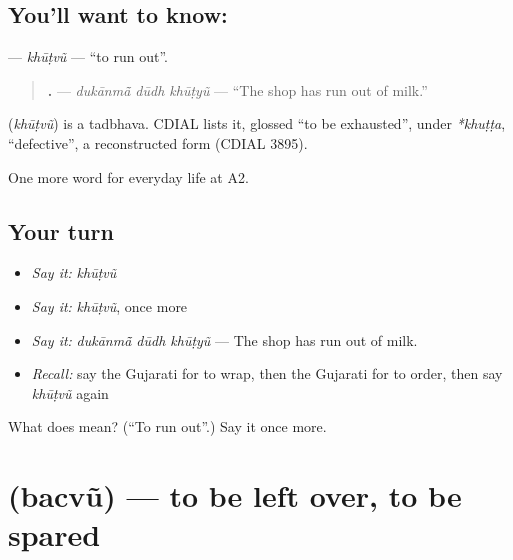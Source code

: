 \subsection*{You'll want to know: }
\textbf{} — \emph{khūṭvũ} — \textquotedblleft{}to run out\textquotedblright{}.

\begin{quote}
\textbf{  .} — \emph{dukānmā̃ dūdh khūṭyũ} — \textquotedblleft{}The shop has run out of milk.\textquotedblright{}
\end{quote}

\begin{cousinweb}
\textbf{} (\emph{khūṭvũ}) is a tadbhava. CDIAL lists it, glossed \textquotedblleft{}to be exhausted\textquotedblright{}, under \emph{*khuṭṭa}, \textquotedblleft{}defective\textquotedblright{}, a reconstructed form (CDIAL 3895).
\end{cousinweb}

\begin{grammarlens}[title={What you've built}]
One more word for everyday life at A2.
\end{grammarlens}

\subsection*{Your turn}
\begin{itemize}
\raggedright
  \item \emph{Say it:} \emph{khūṭvũ}
  \item \emph{Say it:} \emph{khūṭvũ}, once more
  \item \emph{Say it:} \emph{dukānmā̃ dūdh khūṭyũ} — The shop has run out of milk.
  \item \emph{Recall:} say the Gujarati for to wrap, then the Gujarati for to order, then say \emph{khūṭvũ} again
\end{itemize}

\begin{tcolorbox}[breakable,colback=teal!4,colframe=teal!35!black,title={Before you move on}]
What does  mean? (\textquotedblleft{}To run out\textquotedblright{}.) Say it once more.
\end{tcolorbox}
\section[\texorpdfstring{\gu{બચવું} (bacvũ)}{બચવું (bacvũ)}]{ (bacvũ) — to be left over, to be spared}

